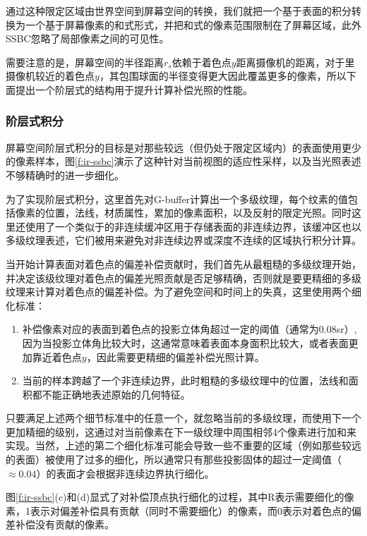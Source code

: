 通过这种限定区域由世界空间到屏幕空间的转换，我们就把一个基于表面的积分转换为一个基于屏幕像素的和式形式，并把和式的像素范围限制在了屏幕区域，此外SSBC忽略了局部像素之间的可见性。

需要注意的是，屏幕空间的半径距离$r_s$依赖于着色点$y$距离摄像机的距离，对于里摄像机较近的着色点$y$，其包围球面的半径变得更大因此覆盖更多的像素，所以下面提出一个阶层式的结构用于提升计算补偿光照的性能。 



\subsubsection{阶层式积分}
屏幕空间阶层式积分的目标是对那些较远（但仍处于限定区域内）的表面使用更少的像素样本，图\ref{f:ir-ssbc}演示了这种针对当前视图的适应性采样，以及当光照表述不够精确时的进一步细化。

为了实现阶层式积分，这里首先对G-buffer计算出一个多级纹理，每个纹素的值包括像素的位置，法线，材质属性，累加的像素面积，以及反射的限定光照。同时这里还使用了一个类似于\cite{a:Hierarchicalimage-spaceradiosityforinteractiveglobalillumination}的非连续缓冲区用于存储表面的非连续边界，该缓冲区也以多级纹理表述，它们被用来避免对非连续边界或深度不连续的区域执行积分计算。

当开始计算表面对着色点的偏差补偿贡献时，我们首先从最粗糙的多级纹理开始，并决定该级纹理对着色点的偏差光照贡献是否足够精确，否则就是要更精细的多级纹理来计算对着色点的偏差补偿。为了避免空间和时间上的失真，这里使用两个细化标准：

\begin{enumerate}
	\item 补偿像素对应的表面到着色点的投影立体角超过一定的阈值（通常为0.08sr）,因为当投影立体角比较大时，这通常意味着表面本身面积比较大，或者表面更加靠近着色点$y$，因此需要更精细的偏差补偿光照计算。
	\item 当前的样本跨越了一个非连续边界，此时粗糙的多级纹理中的位置，法线和面积都不能正确地表述原始的几何特征。
\end{enumerate}

只要满足上述两个细节标准中的任意一个，就忽略当前的多级纹理，而使用下一个更加精细的级别，这通过对当前像素在下一级纹理中周围相邻4个像素进行加和来实现。当然，上述的第二个细化标准可能会导致一些不重要的区域（例如那些较远的表面）被使用了过多的细化，所以通常只有那些投影固体的超过一定阈值（$\approx 0.04$）的表面才会根据非连续边界执行细化。

图\ref{f:ir-ssbc}(c)和(d)显式了对补偿顶点执行细化的过程，其中R表示需要细化的像素，1表示对偏差补偿具有贡献（同时不需要细化）的像素，而0表示对着色点的偏差补偿没有贡献的像素。
 
